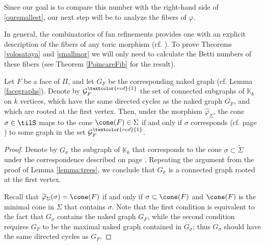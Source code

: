 Since our goal is to compare this number with the right-hand side of \eqref{oursmallest}, our next step will be to analyze the fibers of $\varphi$. 

In general, the combinatorics of fan refinements provides one with an explicit 
description of the fibers of any toric morphism (cf.  \cite{Yau}).
To prove Theorems \ref{volosataya} and \ref{smallmor} we will only need to 
calculate the Betti numbers of these fibers (see Theorem \ref{PoincareFib} for 
the 
result).



  																		


\begin{lemma}\label{fibergraphs} 
Let $F$ be a face of $\Pi$, and let $G_F$ be the corresponding naked graph (cf.  
Lemma \ref{facegraphs}).
Denote by $\mathcal{G}^{\textcolor{red}{1}}_F$  the set of connected  
subgraphs of $\mathbb{K}_k$ on $ k $ vertices, which have the same directed 
cycles as the naked 
graph $G_F$, and which are rooted at the first vertex. 
Then, under the morphism $\widehat{\varphi}_\Sigma$, the cone $\sigma\in\tilS$ 
maps to the cone $\cone(F)\in\Sigma$  if and only if $\sigma$ corresponds (cf.  
page \pageref{corresp}) to some graph in the set 
$\mathcal{G}^{\textcolor{red}{1}}_F$.
\end{lemma}
\begin{proof}
Denote by $G_\sigma$ the subgraph of $\mathbb{K}_k$ that corresponds to the cone $\sigma\subset \widetilde{\Sigma}$ under the correspondence described on page \pageref{corresp}. Repeating the argument from the proof of Lemma \ref{lemma:trees}, we conclude that $G_\sigma$ is a connected graph rooted at the first vertex. 

Recall that $\widehat{\varphi}_\Sigma(\sigma) = \cone(F)$ if and only if 
$\sigma \subset \cone(F)$
and $\cone(F)$ is the minimal cone in $\Sigma$ that contains $\sigma$.
Note that the first condition is equivalent to the fact that $G_\sigma$ contains the naked graph $G_F$, while the second condition requires $G_F$ to be the maximal naked graph contained in $G_\sigma$; thus $G_\sigma$ should have the same directed cycles as $G_F$. 
\end{proof}


